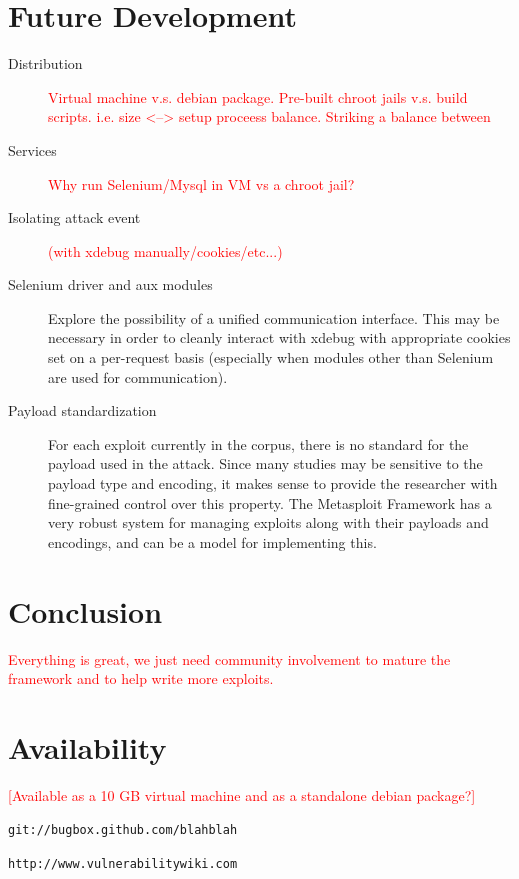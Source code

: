 \documentclass[letterpaper,twocolumn,10pt]{article}
\begin{document}
\section{Future Development}
 \begin{description}
   \item[Distribution]
     \textcolor{red}{Virtual machine v.s. debian package. Pre-built chroot jails v.s. build scripts.
     i.e. size <--> setup proceess balance. Striking a balance between}
   \item[Services]
     \textcolor{red}{Why run Selenium/Mysql in VM vs a chroot jail?}
   \item[Isolating attack event]
     \textcolor{red}{(with xdebug manually/cookies/etc...)}   
   \item[Selenium driver and aux modules]
   Explore the possibility of a unified communication interface. This may be necessary in order to cleanly interact with xdebug with appropriate cookies set on a per-request basis (especially when modules other than Selenium are used for communication).
   \item[Payload standardization]
For each exploit currently in the corpus, there is no standard for the payload used in the attack. Since many studies may be sensitive to the payload type and encoding, it makes sense to provide the researcher with fine-grained control over this property. The Metasploit Framework has a very robust system for managing exploits along with their payloads and encodings, and can be a model for implementing this.
 \end{description}


\section{Conclusion}
\textcolor{red}{
Everything is great, we just need community involvement to mature the framework and to help write more exploits.
}
\section{Availability}
\textcolor{red}{
[Available as a 10 GB virtual machine and as a standalone debian package?]
}
\begin{center}
{\tt git://bugbox.github.com/blahblah}
\end{center}

\begin{center}
{\tt http://www.vulnerabilitywiki.com}
\end{center}

{\footnotesize 
}


\theendnotes
\end{document}
